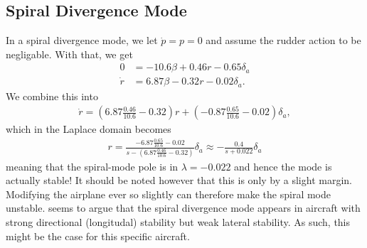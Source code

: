 \subsection{Spiral Divergence Mode}
In a spiral divergence mode, we let $\dot p = p = 0$ and assume the rudder action to be negligable. With that, we get
\begin{align}
0 &= -10.6 \beta + 0.46 r - 0.65 \delta_a \\
\dot r &= 6.87 \beta - 0.32 r - 0.02 \delta_a.
\end{align}
We combine this into
\begin{equation}\begin{aligned}
\dot r = \left(6.87 \frac{0.46}{10.6} - 0.32 \right) r
+ \left( -0.87 \frac{0.65}{10.6} - 0.02 \right) \delta_a,
\end{aligned}\end{equation}
which in the Laplace domain becomes
\begin{equation}\begin{aligned}
r = \frac{-6.87 \frac{0.65}{10.6} - 0.02}{s - (6.87 \frac{0.46}{10.6} -0.32)} \delta_a
\approx -\frac{0.4}{s + 0.022} \delta_a
\end{aligned}\end{equation}
meaning that the spiral-mode pole is in $\lambda = -0.022$ and hence the mode is actually stable! It should be noted however that this is only by a slight margin. Modifying the airplane ever so slightly can therefore make the spiral mode unstable. \cite{nasa} seems to argue that the spiral divergence mode appears in aircraft with strong directional (longitudal) stability but weak lateral stability. As such, this might be the case for this specific aircraft.

